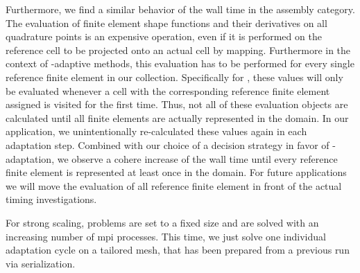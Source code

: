 Furthermore, we find a similar behavior of the wall time in the assembly category.
The evaluation of finite element shape functions and their derivatives on all quadrature points is an expensive operation, even if it is performed on the reference cell to be projected onto an actual cell by mapping. Furthermore in the context of \hp-adaptive methods, this evaluation has to be performed for every single reference finite element in our collection.
Specifically for \dealii{}, these values will only be evaluated whenever a cell with the corresponding reference finite element assigned is visited for the first time. Thus, not all of these evaluation objects are calculated until all finite elements are actually represented in the domain.
In our application, we unintentionally re-calculated these values again in each adaptation step. Combined with our choice of a decision strategy in favor of \p-adaptation, we observe a cohere increase of the wall time until every reference finite element is represented at least once in the domain. For future applications we will move the evaluation of all reference finite element in front of the actual timing investigations.



For strong scaling, problems are set to a fixed size and are solved with an increasing number of \gls{mpi} processes. This time, we just solve one individual adaptation cycle on a tailored mesh, that has been prepared from a previous run via serialization.

